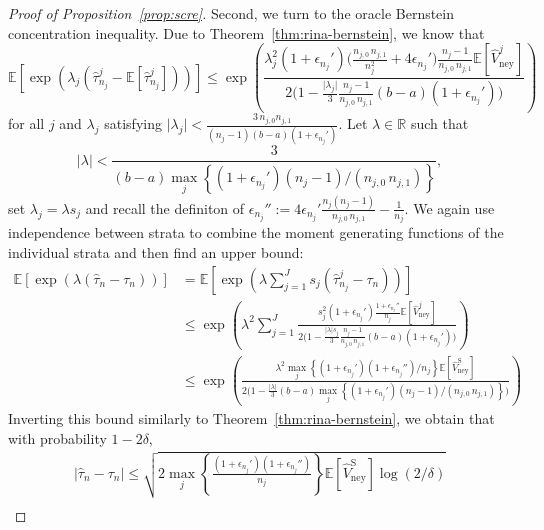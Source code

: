 \documentclass[aos]{imsart2}
\theoremstyle{plain}
\theoremstyle{definition}
\newcommand{\R}{\mathbb{R}}
\newcommand{\E}{\mathbb{E}}
\newcommand{\vhn}{\hat{V}_{\mathrm{ney}}}
\newcommand{\vhns}{\vhn^\mathrm{S}}
\newcommand{\tauh}{\hat{\tau}}
\begin{document}
\begin{appendix}
\begin{proof}[Proof of Proposition~\ref{prop:scre}]
    Second, we turn to the oracle Bernstein concentration inequality. Due to Theorem~\ref{thm:rina-bernstein}, we know that
    \begin{equation*}
        \E\left[\exp\left(\lambda_j (\tauh^j_{n_j}-\E[\tauh^j_{n_j}])\right)\right] \leq 
        \exp\left(\frac{\lambda^2_j (1+\epsilon_{n_j}') \Big(\frac{n_{j,0}\,n_{j,1}}{n_j^2}+4\epsilon_{n_j}'\Big) \frac{n_j-1}{n_{j,0}\,n_{j,1}} \E[\vhn^j]}{2\Big(1-\frac{\lvert \lambda_j\rvert}{3} \frac{n_j-1}{n_{j,0}\,n_{j,1}} (b-a)(1+\epsilon_{n_j}')
        \Big)}\right)
    \end{equation*}
    for all $j$ and $\lambda_j$ satisfying $\lvert \lambda_j\rvert < \frac{3\,n_{j,0}n_{j,1}}{(n_j-1)(b-a)(1+\epsilon_{n_j}')}$.
    Let $\lambda \in \R$ such that
    \begin{equation*}
        \lvert \lambda \rvert < \frac{3}{(b-a)\max_{j} \left\{(1+\epsilon_{n_j}')(n_j-1)/(n_{j,0}\,n_{j,1})\right\}},
    \end{equation*}
    set $\lambda_j = \lambda s_j$ and recall the definiton of $\epsilon_{n_j}'' := 4\epsilon_{n_j}'\frac{n_j(n_j-1)}{n_{j,0}\,n_{j,1}}-\frac{1}{n_j}$. We again use independence between strata to combine the moment generating functions of the individual strata and then find an upper bound:
    \begin{align*}
        \E\left[\exp\left(\lambda (\tauh_n-\tau_n)\right)\right] &= \E\left[\exp\left(\lambda \sum_{j=1}^J s_j(\tauh_{n_j}^j-\tau_n)\right)\right]\\
        &\leq \exp\left(\lambda^2\sum_{j=1}^J \frac{s_j^2(1+\epsilon_{n_j}') \frac{1+\epsilon_{n_j}''}{n_j} \E[\vhn^j]}{2\Big(1-\frac{\lvert \lambda\rvert s_j}{3} \frac{n_j-1}{n_{j,0}\,n_{j,1}} (b-a)(1+\epsilon_{n_j}')
        \Big)}\right)\\
        &\leq \exp\left(\frac{\lambda^2 \max_{j}\left\{(1+\epsilon_{n_j}')(1+\epsilon_{n_j}'')/n_j\right\} \E[\vhns]}{2\Big(1-\frac{\lvert \lambda \rvert}{3}(b-a) \max_{j} \left\{(1+\epsilon_{n_j}')(n_j-1)/(n_{j,0}\,n_{j,1})\right\}\Big)}\right)
    \end{align*}
    Inverting this bound similarly to Theorem~\ref{thm:rina-bernstein}, we obtain that with probability $1-2\delta$,
    \begin{multline}\label{eq:or-bernstein-scre}
        \lvert \tauh_n -\tau_n\rvert \leq \sqrt{2 \max_j\left\{\frac{(1+\epsilon_{n_j}')(1+\epsilon_{n_j}'')}{n_j}\right\} \E[\vhns] \log(2/\delta)}\\

\end{multline}
\end{proof}
\end{appendix}
\end{document}
